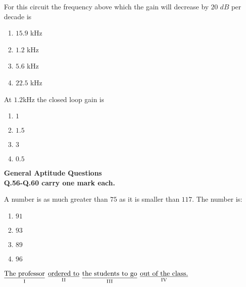     \item  For this circuit the frequency above which the gain will decrease by $20$ $dB$ per decade is 
    \begin{multicols}{4}
    \begin{enumerate}
        \item $15.9$ kHz
        \item $1.2$ kHz
        \item $5.6$ kHz
        \item $22.5$ kHz
    \end{enumerate}
    \end{multicols}
    \item 
    At $1.2$kHz the closed loop gain is 
    \begin{multicols}{4}
        \begin{enumerate}
            \item $1$
            \item $1.5$
            \item $3$
            \item $0.5$
        \end{enumerate}
    \end{multicols}
  
      \textbf{General Aptitude  Questions}\\
    \textbf{Q.56-Q.60 carry one mark each.}
    \item A number is as much greater than $75$ as it is smaller than $117$. The number is:
    \begin{multicols}{4}
    \begin{enumerate}
        \item $91$
        \item $93$
        \item $89$
        \item $96$\\
    \end{enumerate}
        
    \end{multicols}
\item $\underset{\text{I}}{\text{\underline{The professor}}}$ $\underset{\text{II}}{\text{\underline{ordered to}}}$ $\underset{\text{III}}{\text{\underline{the students to go}}}$ $\underset{\text{IV}}{\text{\underline{out of the class.}}}$

